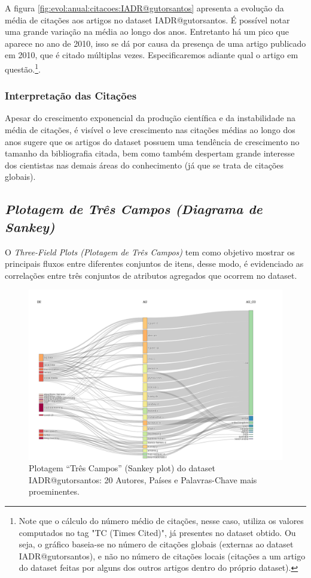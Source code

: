 A figura \ref{fig:evol:anual:citacoes:IADR@gutorsantos} apresenta a evolução da média de citações aos \totalDocumentsIADRgutorsantos{} artigos no dataset IADR@gutorsantos. 
É possível notar uma grande variação na média ao longo dos anos. Entretanto há um pico que aparece no ano de 2010, isso se dá por causa da presença de uma artigo publicado em 2010, que é citado múltiplas vezes. Especificaremos adiante qual o artigo em questão.\footnote{Note que o cálculo do número  médio de citações, nesse caso, utiliza os valores computados no tag "TC (Times Cited)", já presentes no dataset obtido. Ou seja, o gráfico baseia-se no número de citações globais (externas ao dataset IADR@gutorsantos), e não no número de citações locais (citações a um artigo do dataset feitas por alguns dos outros artigos dentro do próprio dataset).}.

\subsubsection{Interpretação das Citações}
Apesar do crescimento exponencial da produção científica e da instabilidade na média de citações, é visível o leve crescimento nas citações médias ao longo dos anos sugere que os artigos do dataset possuem uma tendência de crescimento no tamanho da bibliografia citada, bem como também despertam grande interesse dos cientistas nas demais áreas do conhecimento (já que se trata de citações globais).

\subsection{\textit{Plotagem de Três Campos (Diagrama de Sankey)}}

O \textit{Three-Field Plots (Plotagem de Três Campos)} tem como objetivo mostrar os principais fluxos entre diferentes conjuntos de itens, desse modo, é evidenciado as correlações entre três conjuntos de atributos agregados que ocorrem no dataset.

\begin{figure}[H]
    \centering
    \includegraphics[angle=0,width=1\textwidth]{experiments/gutorsantos/AnaliseBibliometrica/IAeDiscriminacao/imgs/ThreeFieldPlot.png}
    \caption{Plotagem ``Três Campos'' (Sankey plot) do dataset IADR@gutorsantos: 20 Autores, Países e Palavras-Chave mais proeminentes.}
    \label{fig:IADR@gutorsantos:ThreeFieldPlot}
\end{figure}

